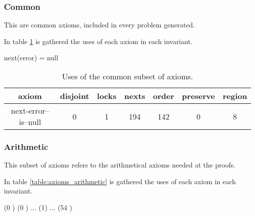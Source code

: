 
\subsubsection{Common}
	This are common axioms, included in every \spass problem generated. 

	In table \ref{table:axioms_common} is gathered the uses of each axiom in each invariant.


	\begin{axiomdescription}
		\label{ax::next_error__is__null}
		\begin{formula}
			next(error) = null
		\end{formula}
	\end{axiomdescription}

	\begin{table}[hbtp]
		\centering
		\begin{tabular}{c|cccccc}
			axiom & disjoint & locks & nexts & order & preserve & region 
			\\\hline
			next-error--is--null & 0 & 1 & 194 & 142 & 0 & 8 
			\\
		\end{tabular}
		\label{table:axioms_common}
		\caption{Uses of the common subset of axioms.}
	\end{table}



\subsubsection{Arithmetic}
	
	This subset of axioms refers to the arithmetical axioms needed at the proofs.
	
	In table \ref{table:axioms_arithmetic} is gathered the uses of each axiom in each invariant.

	\begin{axiomdescription}
		\label{ax::nums_are_different}
		\begin{formula}
			(0 ) \andcond (0 ) \andcond ... \andcond (1) \andcond ... (54 )
		\end{formula}
	\end{axiomdescription}


